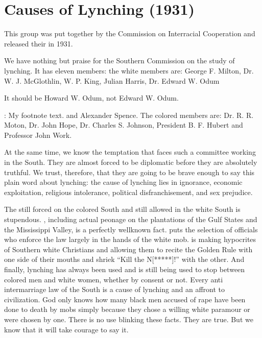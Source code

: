 \documentclass[letterpaper,10pt,english]{jupyterBook}
\begin{document}
\section{Causes of Lynching (1931)}
\label{\detokenize{Volumes/38/04/causes_of_lynching:causes-of-lynching-1931}}\label{\detokenize{Volumes/38/04/causes_of_lynching::doc}}
\begin{sphinxShadowBox}
\sphinxstylesidebartitle{}

\sphinxAtStartPar
This group was put together by the Commission on Interracial Cooperation and released their  in 1931.
\end{sphinxShadowBox}

\sphinxAtStartPar
We have nothing but praise for the Southern Commission on the study of lynching. It has eleven members: the white members are: George F. Milton, Dr. W. J. McGlothlin, W. P. King, Julian Harris, Dr. Edward W. Odum%
\begin{footnote}[1]\sphinxAtStartFootnote
It should be Howard W. Odum, not Edward W. Odum.
%
\end{footnote}: My footnote text. and Alexander Spence. The colored members are: Dr. R. R. Moton, Dr. John Hope, Dr. Charles S. Johnson, President B. F. Hubert and Professor John Work.

\sphinxAtStartPar
At the same time, we know the temptation that faces such a committee working in the South. They are almost forced to be diplomatic before they are absolutely truthful. We trust, therefore, that they are going to be brave enough to say this plain word about lynching: the cause of lynching lies in ignorance, economic exploitation, religious intolerance, political disfranchisement, and sex prejudice.

\sphinxAtStartPar
The  still forced on the colored South and still allowed in the white South is stupendous. , including actual peonage on the plantations of the Gulf States and the Mississippi Valley, is a perfectly well\sphinxhyphen{}known fact.  puts the selection of officials who enforce the law largely in the hands of the white mob.  is making hypocrites of Southern white Christians and allowing them to recite the Golden Rule with one side of their mouths and shriek “Kill the N{[}*****{]}!” with the other. And finally, lynching has always been used and is still being used to stop  between colored men and white women, whether by consent or not. Every anti intermarriage law of the South is a cause of lynching and an affront to civilization. God only knows how many black men accused of rape have been done to death by mobs simply because they chose a willing white paramour or were chosen by one. There is no use blinking these facts. They are true. But we know that it will take courage to say it.
\end{document}
